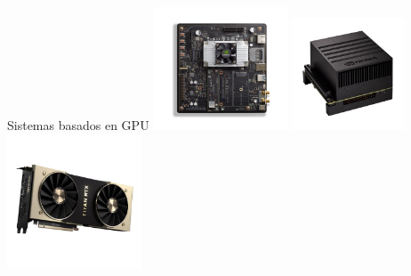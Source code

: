 \begin{frame}{Sistemas basados en GPU}
\resizebox{\linewidth}{!}{%

}
\centering
 \includegraphics[width=0.3\textwidth]{fig/JTX2.png}
  \includegraphics[width=0.25\textwidth]{fig/XAVIER.jpg}
    \includegraphics[width=0.3\textwidth]{fig/titan.jpg}
  \end{frame}


